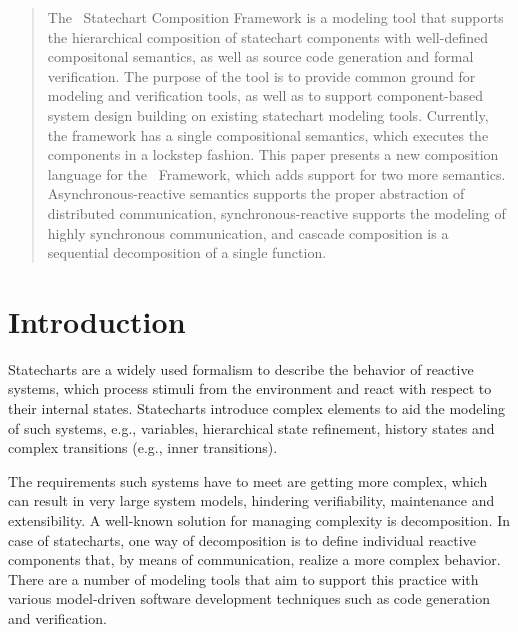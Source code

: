 \begin{abstract}

The \gamma\ Statechart Composition Framework is a modeling tool that supports the hierarchical composition of statechart components with well-defined compositonal semantics, as well as source code generation and formal verification. The purpose of the tool is to provide common ground for modeling and verification tools, as well as to support component-based system design building on existing statechart modeling tools. Currently, the framework has a single compositional semantics, which executes the components in a lockstep fashion. This paper presents a new composition language for the \gamma\ Framework, which adds support for two more semantics. Asynchronous-reactive semantics supports the proper abstraction of distributed communication, synchronous-reactive supports the modeling of highly synchronous communication, and cascade composition is a sequential decomposition of a single function. 
\end{abstract}
%
\IEEEpeerreviewmaketitle

\section{Introduction}
\label{sec:introduction}
Statecharts \cite{Harel:1987:SVF:34884.34886} are a widely used formalism to describe the behavior of reactive systems, which process stimuli from the environment and react with respect to their internal states. Statecharts introduce complex elements to aid the modeling of such systems, e.g., variables, hierarchical state refinement, history states and complex transitions (e.g., inner transitions).

The requirements such systems have to meet are getting more complex, which can result in very large system models, hindering verifiability, maintenance and extensibility. A well-known solution for managing complexity is decomposition. In case of statecharts, one way of decomposition is to define individual reactive components that, by means of communication, realize a more complex behavior. There are a number of modeling tools that aim to support this practice with various model-driven software development techniques such as code generation and verification.

